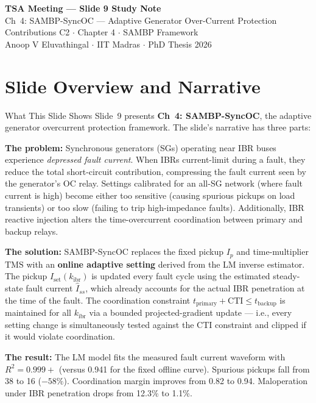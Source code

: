 \documentclass[12pt,a4paper]{article}
\newcommand{\kibr}{k_\mathrm{ibr}}
\newcommand{\TMS}{\mathrm{TMS}}
\newcommand{\Iset}{I_\mathrm{set}}
\newcommand{\tpri}{t_\mathrm{primary}}
\newcommand{\tbak}{t_\mathrm{backup}}
\newcommand{\CTI}{\mathrm{CTI}}
\begin{document}
\begin{tcolorbox}[colback=iitmnavy,coltext=white,arc=4pt,boxrule=0pt]
\begin{center}
  {\Large\bfseries TSA Meeting --- Slide 9 Study Note}\\[4pt]
  {\large Ch~4: SAMBP-SyncOC --- Adaptive Generator Over-Current Protection}\\[6pt]
  {\normalsize Contributions C2 $\cdot$ Chapter 4 $\cdot$ SAMBP Framework}\\[2pt]
  {\small Anoop V Eluvathingal $\cdot$ IIT Madras $\cdot$ PhD Thesis 2026}
\end{center}
\end{tcolorbox}

\vspace{6pt}

\section{Slide Overview and Narrative}

\begin{keybox}{What This Slide Shows}
Slide~9 presents \textbf{Ch~4: SAMBP-SyncOC}, the adaptive generator overcurrent protection framework. The slide's narrative has three parts:

\textbf{The problem:} Synchronous generators (SGs) operating near IBR buses experience \emph{depressed fault current}. When IBRs current-limit during a fault, they reduce the total short-circuit contribution, compressing the fault current seen by the generator's OC relay. Settings calibrated for an all-SG network (where fault current is high) become either too sensitive (causing spurious pickups on load transients) or too slow (failing to trip high-impedance faults). Additionally, IBR reactive injection alters the time-overcurrent coordination between primary and backup relays.

\textbf{The solution:} SAMBP-SyncOC replaces the fixed pickup $I_p$ and time-multiplier $\TMS$ with an \textbf{online adaptive setting} derived from the LM inverse estimator. The pickup $\Iset(\kibr)$ is updated every fault cycle using the estimated steady-state fault current $\hat{I}_{ss}$, which already accounts for the actual IBR penetration at the time of the fault. The coordination constraint $\tpri + \CTI \leq \tbak$ is maintained for all $\kibr$ via a bounded projected-gradient update --- i.e., every setting change is simultaneously tested against the CTI constraint and clipped if it would violate coordination.

\textbf{The result:} The LM model fits the measured fault current waveform with $R^2 = 0.999+$ (versus 0.941 for the fixed offline curve). Spurious pickups fall from 38 to 16 ($-58\%$). Coordination margin improves from 0.82 to 0.94. Maloperation under IBR penetration drops from 12.3\% to 1.1\%.
\end{keybox}
\end{document}
